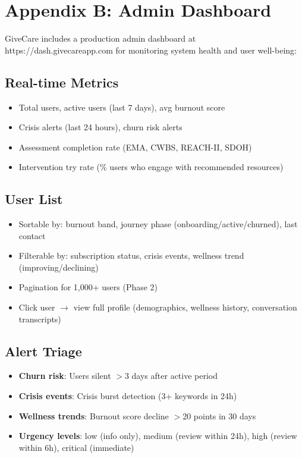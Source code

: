 \documentclass{article}
\begin{document}
\section*{Appendix B: Admin Dashboard}

GiveCare includes a production admin dashboard at https://dash.givecareapp.com for monitoring system health and user well-being:

\subsection*{Real-time Metrics}
\begin{itemize}
    \item Total users, active users (last 7 days), avg burnout score
    \item Crisis alerts (last 24 hours), churn risk alerts
    \item Assessment completion rate (EMA, CWBS, REACH-II, SDOH)
    \item Intervention try rate (\% users who engage with recommended resources)
\end{itemize}

\subsection*{User List}
\begin{itemize}
    \item Sortable by: burnout band, journey phase (onboarding/active/churned), last contact
    \item Filterable by: subscription status, crisis events, wellness trend (improving/declining)
    \item Pagination for 1,000+ users (Phase 2)
    \item Click user $\rightarrow$ view full profile (demographics, wellness history, conversation transcripts)
\end{itemize}

\subsection*{Alert Triage}
\begin{itemize}
    \item \textbf{Churn risk}: Users silent $>$3 days after active period
    \item \textbf{Crisis events}: Crisis burst detection (3+ keywords in 24h)
    \item \textbf{Wellness trends}: Burnout score decline $>$20 points in 30 days
    \item \textbf{Urgency levels}: low (info only), medium (review within 24h), high (review within 6h), critical (immediate)
\end{itemize}
\end{document}
